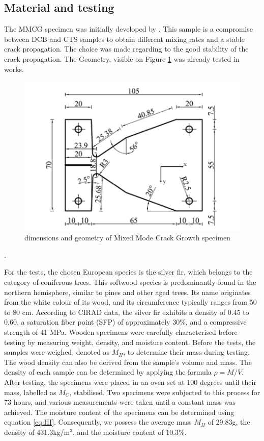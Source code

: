 \documentclass[3p,times,procedia]{elsarticle}
\begin{document}
\subsection{Material and testing}\label{Ss:spec}

The MMCG specimen was initially developed by \citet{MoutouPitti2008}. This sample is a compromise between DCB and CTS samples to obtain different mixing rates and a stable crack propagation. The choice was made regarding to the good stability of the crack propagation. The Geometry, visible on Figure \ref{fig:Fig5} was already tested in \citep{Odounga2018phd} works.

\begin{figure}[th]
	\centering
	\includegraphics[scale=0.4]{Figures/fig23}
	\caption[MMCG specimen]{dimensions and geometry of Mixed Mode Crack Growth specimen}
	\label{fig:Fig5}
\end{figure}.

For the tests, the chosen European species is the silver fir, which belongs to the category of coniferous trees. This softwood species is predominantly found in the northern hemisphere, similar to pines and other aged trees. Its name originates from the white colour of its wood, and its circumference typically ranges from 50 to 80 cm. According to CIRAD data, the silver fir exhibits a density of 0.45 to 0.60, a saturation fiber point (SFP) of approximately 30\%, and a compressive strength of 41 MPa.
Wooden specimens were carefully characterised before testing by measuring weight, density, and moisture content. Before the tests, the samples were weighed, denoted as $M_H$, to determine their mass during testing. The wood density can also be derived from the sample's volume and mass. The density of each sample can be determined by applying the formula $\rho = M/V$.
After testing, the specimens were placed in an oven set at 100 degrees until their mass, labelled as $M_C$, stabilised. Two specimens were subjected to this process for 73 hours, and various measurements were taken until a constant mass was achieved. The moisture content of the specimens can be determined using equation \ref{eq:HI}. Consequently, we possess the average mass $M_H$ of 29.83g, the density of 431.3kg/m$^3$, and the moisture content of 10.3\%.
\end{document}
